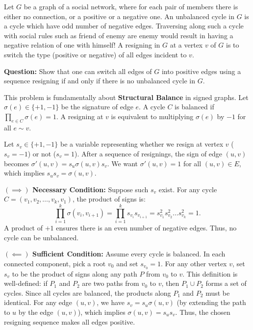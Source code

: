 \begin{exercise}
\label{applied:2015:7}
Let $G$ be a graph of a social network, where for each pair of members there is either no connection, or a positive or a negative one. An unbalanced cycle in $G$ is a cycle which have odd number of negative edges. Traversing along such a cycle with social rules such as friend of enemy are enemy would result in having a negative relation of one with himself! A resigning in $G$ at a vertex $v$ of $G$ is to switch the type (positive or negative) of all edges incident to $v$.

\textbf{Question:} Show that one can switch all edges of $G$ into positive edges using a sequence resigning if and only if there is no unbalanced cycle in $G$.
\end{exercise}

\begin{solution}
This problem is fundamentally about \textbf{Structural Balance} in signed graphs. Let $\sigma(e) \in \{+1, -1\}$ be the signature of edge $e$. A cycle $C$ is balanced if $\prod_{e \in C} \sigma(e) = 1$. A resigning at $v$ is equivalent to multiplying $\sigma(e)$ by $-1$ for all $e \sim v$.

Let $s_v \in \{+1, -1\}$ be a variable representing whether we resign at vertex $v$ ($s_v = -1$) or not ($s_v = 1$). After a sequence of resignings, the sign of edge $(u,v)$ becomes $\sigma'(u,v) = s_u \sigma(u,v) s_v$. We want $\sigma'(u,v) = 1$ for all $(u,v) \in E$, which implies $s_u s_v = \sigma(u,v)$.

\textbf{$(\implies)$ Necessary Condition:}
Suppose such $s_v$ exist. For any cycle $C = (v_1, v_2, \dots, v_k, v_1)$, the product of signs is:
\[
\prod_{i=1}^k \sigma(v_i, v_{i+1}) = \prod_{i=1}^k s_{v_i} s_{v_{i+1}} = s_{v_1}^2 s_{v_2}^2 \dots s_{v_k}^2 = 1.
\]
A product of $+1$ ensures there is an even number of negative edges. Thus, no cycle can be unbalanced.

\textbf{$(\impliedby)$ Sufficient Condition:}
Assume every cycle is balanced. In each connected component, pick a root $v_0$ and set $s_{v_0} = 1$. For any other vertex $v$, set $s_v$ to be the product of signs along any path $P$ from $v_0$ to $v$. 
This definition is well-defined: if $P_1$ and $P_2$ are two paths from $v_0$ to $v$, then $P_1 \cup P_2$ forms a set of cycles. Since all cycles are balanced, the products along $P_1$ and $P_2$ must be identical.
For any edge $(u,v)$, we have $s_v = s_u \sigma(u,v)$ (by extending the path to $u$ by the edge $(u,v)$), which implies $\sigma(u,v) = s_u s_v$. Thus, the chosen resigning sequence makes all edges positive.
\end{solution}

